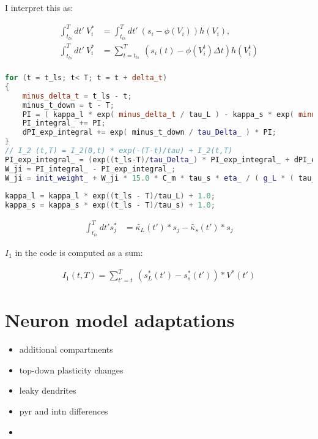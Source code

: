 I interpret this as:


\begin{align}
  \int_{t_{ls}}^T dt' \ V_i^* & = \int_{t_{ls}}^T dt' \  (s_i - \phi(V_i )) h(V_i),               \\
  \int_{t_{ls}}^T dt' \ V_i^* & = \sum_{t=t_{ls}}^T \  (s_i(t) -  \phi(V_i^t ) \Delta t) h(V_i^t) \\
\end{align}

\begin{lstlisting}[language=C++, directivestyle={\color{black}}
                   emph={int,char,double,float,unsigned,exp},
                   emphstyle={\color{blue}}]
for (t = t_ls; t< T; t = t + delta_t)
{
   	minus_delta_t = t_ls - t;
    minus_t_down = t - T;
    PI = ( kappa_l * exp( minus_delta_t / tau_L ) - kappa_s * exp( minus_delta_t / tau_s ) ) * V_star(t);
    PI_integral_ += PI;
    dPI_exp_integral += exp( minus_t_down / tau_Delta_ ) * PI;
}  
// I_2 (t,T) = I_2(0,t) * exp(-(T-t)/tau) + I_2(t,T)
PI_exp_integral_ = (exp((t_ls-T)/tau_Delta_) * PI_exp_integral_ + dPI_exp_integral);
W_ji = PI_integral_ - PI_exp_integral_;
W_ji = init_weight_ + W_ji * 15.0 * C_m * tau_s * eta_ / ( g_L * ( tau_L - tau_s ) );    
  
kappa_l = kappa_l * exp((t_ls - T)/tau_L) + 1.0;
kappa_s = kappa_s * exp((t_ls - T)/tau_s) + 1.0;
  \end{lstlisting}


\begin{align}
  \int_{t_{ls}}^T dt' s_j^* & =  \tilde{\kappa_L}(t') * s_j -  \tilde{\kappa_s}(t') * s_j
\end{align}

$I_1$ in the code is computed as a sum:

\begin{align}
  I_1 (t,T) = \sum_{t'=t}^T \ (s_L^*(t') - s_s^*(t')) * V^*(t')
\end{align}


\section{Neuron model adaptations}

\begin{itemize}
  \item additional compartments
  \item top-down plasticity changes
  \item leaky dendrites
  \item pyr and intn differences
  \item
\end{itemize}


